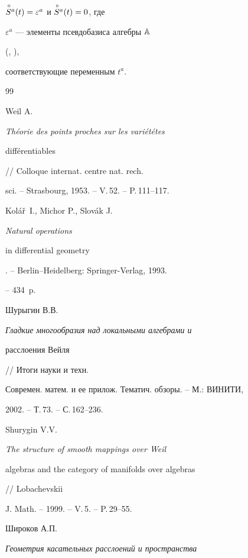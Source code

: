 $\overset{\,\circ}{S}{}^a(t)=\varepsilon^a$ и $\overset{\,\circ}{S}{}^a(t)=0$, где


$\varepsilon^a$ --- элементы псевдобазиса алгебры ${\Bbb A}$


(\cite{Wag}, \cite{VSh1}),


соответствующие переменным $t^a$.








\begin{thebibliography}{99}







Weil A. {\it Th\'eorie des points proches sur les vari\'et\'etes


diff\'erentiables} // Colloque internat. centre nat. rech.


sci. -- Strasbourg, 1953. -- V.\,52. -- P.\,111--117.







Kol\'a\v{r}~I., Michor P., Slov\'ak J. {\it Natural operations


in differential geometry}. -- Berlin--Heidelberg: Springer-Verlag, 1993.


-- 434~p.







Шурыгин В.В. {\it Гладкие многообразия над локальными алгебрами и


расслоения Вейля} // Итоги науки и техн.


Современ. матем. и ее прилож. Тематич. обзоры. -- М.: ВИНИТИ,


2002. -- Т.\,73. -- С.\,162--236.







Shurygin V.V. {\it The structure of smooth mappings over Weil


algebras and the category of manifolds over algebras} // Lobachevskii


J. Math. -- 1999. -- V.\,5. -- P.\,29--55.







Широков А.П. {\it Геометрия касательных расслоений и пространства


}
\end{thebibliography}
